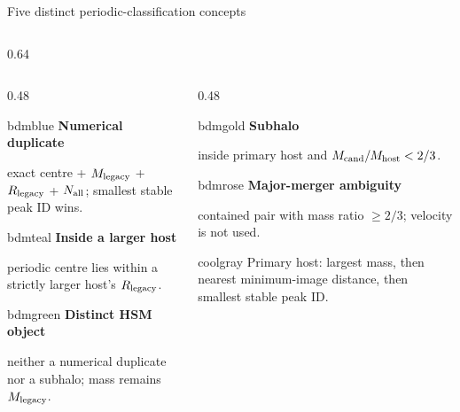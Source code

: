 \documentclass[UTF8]{beamer}
\begin{document}
\begin{frame}{Five distinct periodic-classification concepts}
  \scriptsize
  \begin{columns}[T,totalwidth=\textwidth]
    \begin{column}{0.64\textwidth}
      \begin{columns}[T,totalwidth=\linewidth]
        \begin{column}{0.48\linewidth}
          \begin{phasebox}[top=0.7mm,bottom=0.7mm]{bdmblue}
            \textbf{Numerical duplicate}\par
            exact centre + $M_{\rm legacy}$ + $R_{\rm legacy}$ + $N_{\rm all}$;
            smallest stable peak ID wins.
          \end{phasebox}
          \begin{phasebox}[top=0.7mm,bottom=0.7mm]{bdmteal}
            \textbf{Inside a larger host}\par
            periodic centre lies within a strictly larger host's $R_{\rm legacy}$.
          \end{phasebox}
          \begin{phasebox}[top=0.7mm,bottom=0.7mm]{bdmgreen}
            \textbf{Distinct HSM object}\par
            neither a numerical duplicate nor a subhalo; mass remains $M_{\rm legacy}$.
          \end{phasebox}
        \end{column}
        \hfill
        \begin{column}{0.48\linewidth}
          \begin{phasebox}[top=0.7mm,bottom=0.7mm]{bdmgold}
            \textbf{Subhalo}\par
            inside primary host and $M_{\rm cand}/M_{\rm host}<2/3$.
          \end{phasebox}
          \begin{phasebox}[top=0.7mm,bottom=0.7mm]{bdmrose}
            \textbf{Major-merger ambiguity}\par
            contained pair with mass ratio $\geq2/3$; velocity is not used.
          \end{phasebox}
          \begin{phasebox}[colback=bdmpale,top=0.7mm,bottom=0.7mm]{coolgray}
            Primary host: largest mass, then nearest minimum-image distance,
            then smallest stable peak ID.
          \end{phasebox}
        \end{column}

\end{columns}
\end{column}
\end{columns}
\end{frame}
\end{document}
